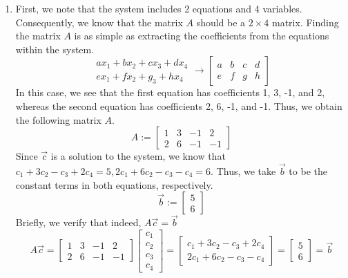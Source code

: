 \begin{SaveQuestion}
    \begin{enumerate}
        \item First, we note that the system includes 2 equations and 4 variables. Consequently, we know that the matrix $A$ should be a $2 \times 4$ matrix. Finding the matrix $A$ is as simple as extracting the coefficients from the equations within the system.
        $$\begin{matrix} ax_1 + bx_2 + cx_3 + dx_4 \\ ex_1 + fx_2 + g_3 + hx_4 \end{matrix} \longrightarrow \begin{bmatrix} a & b & c & d \\ e & f & g & h \end{bmatrix}$$
        In this case, we see that the first equation has coefficients 1, 3, -1, and 2, whereas the second equation has coefficients 2, 6, -1, and -1. Thus, we obtain the following matrix $A$.
        $$A := \begin{bmatrix} 1 & 3 & -1 & 2 \\ 2 & 6 & -1 & -1 \end{bmatrix}$$
        Since $\vec c$ is a solution to the system, we know that $c_1 + 3c_2 - c_3 + 2c_4 = 5, 2c_1 + 6c_2 - c_3 - c_4 = 6$. Thus, we take $\vec b$ to be the constant terms in both equations, respectively.
        $$\vec b := \begin{bmatrix} 5 \\ 6 \end{bmatrix}$$
        Briefly, we verify that indeed, $A\vec c = \vec b$
        $$A\vec c = \begin{bmatrix} 1 & 3 & -1 & 2 \\ 2 & 6 & -1 & -1 \end{bmatrix} \begin{bmatrix} c_1 \\ c_2 \\ c_3 \\ c_4 \end{bmatrix} = \begin{bmatrix} c_1 + 3c_2 - c_3 + 2c_4 \\ 2c_1 + 6c_2 - c_3 - c_4 \end{bmatrix} = \begin{bmatrix} 5 \\ 6 \end{bmatrix} = \vec b$$
        

\end{enumerate}
\end{SaveQuestion}
